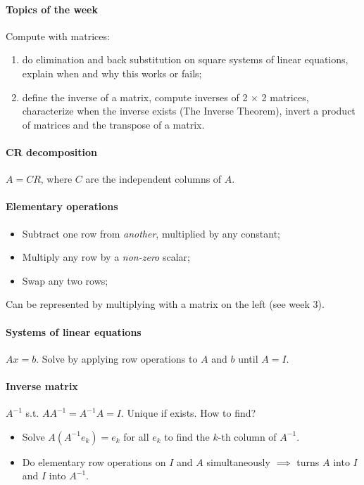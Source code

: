 \documentclass{article}
\begin{document}
\paragraph{Topics of the week} Compute with matrices:  

\begin{enumerate}
    \item do elimination and back substitution on square systems of linear equations, explain when and why this works or fails;
    \item define the inverse of a matrix, compute inverses of 2 × 2 matrices, characterize when the inverse exists (The Inverse Theorem), invert a product of matrices and the transpose of a matrix.
\end{enumerate}

\paragraph{CR decomposition} $A = CR$, where $C$ are the independent columns of $A$.

\paragraph{Elementary operations}
\begin{itemize}
    \item Subtract one row from \textit{another}, multiplied by any constant;
    \item Multiply any row by a \textit{non-zero} scalar;
    \item Swap any two rows;
\end{itemize}

Can be represented by multiplying with a matrix on the left (see week 3).

\paragraph{Systems of linear equations} $Ax = b$. Solve by applying row operations to $A$ and $b$ until $A = I$.

\paragraph{Inverse matrix} $A^{-1}$ s.t. $A A^{-1} = A^{-1} A = I$. Unique if exists. How to find?

\begin{itemize}
    \item Solve $A (A^{-1} e_k) = e_k$ for all $e_k$ to find the $k$-th column of $A^{-1}$.
    \item Do elementary row operations on $I$ and $A$ simultaneously $\implies$ turns $A$ into $I$ and $I$ into $A^{-1}$.
\end{itemize}
\end{document}
